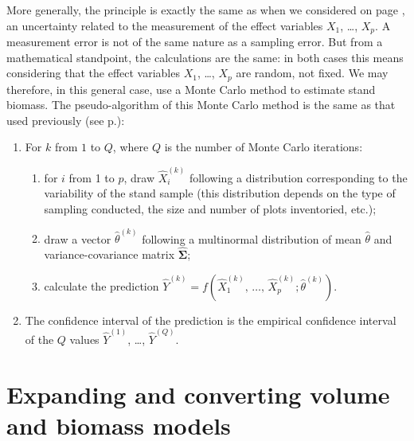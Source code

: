 More generally, the principle is exactly the same as when we considered on page \pageref{errmes}, an uncertainty related to the measurement of the effect variables $X_1$, \ldots, $X_p$. A measurement error is not of the same nature as a sampling error. But from a mathematical standpoint, the calculations are the same: in both cases this means considering that the effect variables $X_1$, \ldots, $X_p$
are random, not fixed. We may therefore, in this general case, use a Monte Carlo method to estimate stand biomass. The pseudo-algorithm of this Monte Carlo method is the same as that used previously (see p.\pageref{psa}):
\begin{enumerate}
\item For $k$ from $1$ to $Q$, where $Q$ is the number of Monte Carlo iterations:
    \begin{enumerate}
    \item for $i$ from 1 to $p$, draw $\hat{X}_i^{(k)}$ following a distribution corresponding to the variability of the stand sample (this distribution depends on the type of sampling conducted, the size and number of plots inventoried, etc.);
    \item draw a vector $\hat{\theta}^{(k)}$ following a multinormal distribution of mean $\hat{\theta}$ and variance-covariance matrix $\hat{\boldsymbol{\Sigma}}$;
    \item calculate the prediction 
    $\hat{Y}^{(k)}=f(\hat{X}_1^{(k)},\,\ldots,\,\hat{X}_p^{(k)};
    \hat{\theta}^{(k)})$.
    \end{enumerate}
\item The confidence interval of the prediction is the empirical confidence interval of the $Q$ values $\hat{Y}^{(1)}$, \ldots,
$\hat{Y}^{(Q)}$.
\end{enumerate}

\section{Expanding and converting volume and biomass models\label{BEF}}


